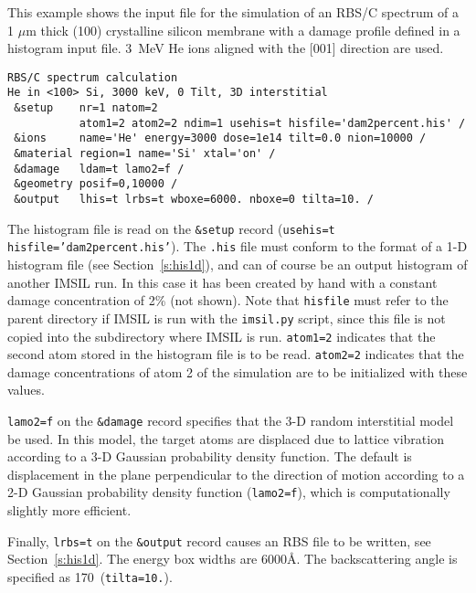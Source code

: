 This example shows the input file for the simulation of an RBS/C spectrum
of a 1 $\mu$m thick (100) crystalline silicon membrane with a damage profile
defined in a histogram input file. 3~MeV He ions aligned with the [001]
direction are used.

\begin{verbatim}
RBS/C spectrum calculation  
He in <100> Si, 3000 keV, 0 Tilt, 3D interstitial
 &setup    nr=1 natom=2 
           atom1=2 atom2=2 ndim=1 usehis=t hisfile='dam2percent.his' /  
 &ions     name='He' energy=3000 dose=1e14 tilt=0.0 nion=10000 /
 &material region=1 name='Si' xtal='on' /
 &damage   ldam=t lamo2=f /
 &geometry posif=0,10000 /
 &output   lhis=t lrbs=t wboxe=6000. nboxe=0 tilta=10. / 
\end{verbatim}

The histogram file is read on the \texttt{\&setup} record (\texttt{usehis=t
hisfile='dam2percent.his'}). The \texttt{.his} file must conform to the format
of a 1-D histogram file (see Section~\ref{s:his1d}), and can of course be an
output histogram of another IMSIL run. In this case it has been created by hand
with a constant damage concentration of 2\% (not shown). Note that
\texttt{hisfile} must refer to the parent directory if IMSIL is run with the
\texttt{imsil.py} script, since this file is not copied into the subdirectory
where IMSIL is run. \texttt{atom1=2} indicates that the second atom stored in
the histogram file is to be read. \texttt{atom2=2} indicates that the damage
concentrations of atom 2 of the simulation are to be initialized with these
values.

\texttt{lamo2=f} on the \texttt{\&damage} record specifies that the 3-D random
interstitial model be used. In this model, the target atoms are displaced due to
lattice vibration according to a 3-D Gaussian probability density function. The
default is displacement in the plane perpendicular to the direction of motion
according to a 2-D Gaussian probability density function (\texttt{lamo2=f}),
which is computationally slightly more efficient.

Finally, \texttt{lrbs=t} on the \texttt{\&output} record causes an RBS file to
be written, see Section~\ref{s:his1d}. The energy box widths are 6000\AA. The
backscattering angle is specified as 170\textdegree\ (\texttt{tilta=10.}).
